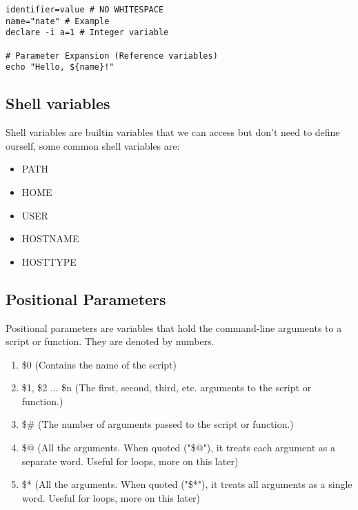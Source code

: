 \documentclass{report}
\begin{document}
    \begin{verbatim}
identifier=value # NO WHITESPACE
name="nate" # Example
declare -i a=1 # Integer variable

# Parameter Expansion (Reference variables)
echo "Hello, ${name}!" 
    \end{verbatim}
    \bigbreak \noindent 
    

    \bigbreak \noindent 
    \subsection{Shell variables}
    \bigbreak \noindent 
    Shell variables are builtin variables that we can access but don't need to define ourself, some common shell variables are:
    \begin{itemize}
        \item PATH
        \item HOME 
        \item USER 
        \item HOSTNAME
        \item HOSTTYPE
    \end{itemize}
    \bigbreak \noindent 
    \subsection{Positional Parameters}
    \bigbreak \noindent 
    Positional parameters are variables that hold the command-line arguments to a script or function. They are denoted by numbers.
    \begin{enumerate}
        \item \$0 (Contains the name of the script)
        \item \$1, \$2 ... \$n (The first, second, third, etc. arguments to the script or function.)
        \item \$\# (The number of arguments passed to the script or function.)
        \item \$@ (All the arguments. When quoted ("\$@"), it treats each argument as a separate word. Useful for loops, more on this later)
        \item \$* (All the arguments. When quoted ("\$*"), it treats all arguments as a single word. Useful for loops, more on this later)
    \end{enumerate}

    \pagebreak \bigbreak \noindent 
\end{document}
